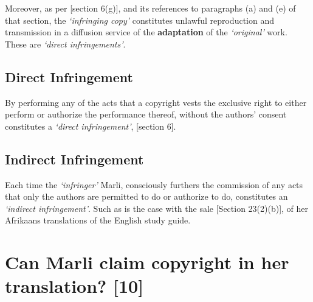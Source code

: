 \documentclass[11pt]{article}
\begin{document}
Moreover, as per [section 6(g)]\cite{rsa78_copyrightact}, and its
references to paragraphs (a) and (e) of that section, the \emph{`infringing
copy'} constitutes unlawful reproduction and transmission in  a
diffusion service of the \textbf{adaptation} of the \emph{`original'} work. These
are \emph{`direct infringements'}.

\subsection{Direct Infringement}
\label{sec:org280f241}
By performing any of the acts that a copyright vests the exclusive
right to either perform or authorize the performance thereof, without
the authors' consent constitutes a \emph{`direct infringement'}, [section
6]\cite{rsa78_copyrightact}.

\subsection{Indirect Infringement}
\label{sec:org0875d2a}
Each time the \emph{`infringer'} Marli, consciously furthers the commission
of any acts that only the authors are permitted to do or authorize to
do, constitutes an \emph{`indirect infringement'}. Such as is the case with
the sale [Section 23(2)(b)]\cite{rsa78_copyrightact}, of her Afrikaans
translations of the English study guide.

\section{Can Marli claim copyright in her translation? \textbf{[10]}}
\label{sec:org75f1b8b}
\end{document}
